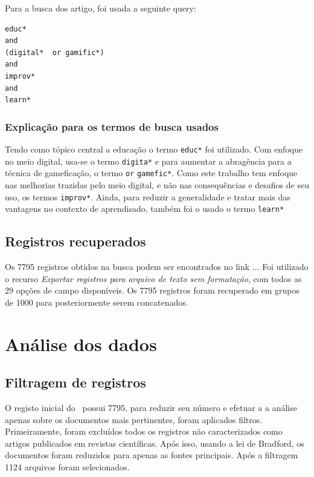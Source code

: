 Para a busca dos artigo, foi usada a seguinte query:
\begin{verbatim}
educ*
and
(digital*  or gamific*)
and
improv*
and
learn*
\end{verbatim}

\subsubsection{Explicação para os termos de busca usados\label{}}

Tendo como tópico central a educação o termo \texttt{educ*}  foi utilizado. Com enfoque no meio digital, usa-se o termo \texttt{digita*} e para aumentar a abragência para  a técnica de gameficação, o termo \texttt{or} \texttt{gamefic*}. Como este trabalho tem enfoque nas melhorias trazidas pelo meio digital, e não nas consequências e desafios de seu uso, os termos \texttt{improv*}. Ainda, para reduzir a generalidade e tratar mais das vantagens no contexto de aprendisado, também foi o usado o termo \texttt{learn*}


\subsection{Registros recuperados}

 Os 7795 registros obtidos na busca podem ser encontrados no link ...
Foi utilizado o recurso \textit{Exportar registros para arquivo de texto sem formatação}, com todos as 29 opções de campo disponíveis. Os 7795 registros foram recuperado em grupos de 1000 para posteriormente serem concatenados.

\section{Análise dos dados}

\subsection{Filtragem de registros}


O registo inicial do \dataset\ possui 7795, para reduzir seu número e efetuar a a análise apenas sobre os documentos mais pertinentes, foram aplicados filtros. Primeiramente, foram excluídos todos os registros não caracterizados como artigos publicados em revistas científicas. Após isso, usando a lei de Bradford, os documentos foram reduzidos para apenas as fontes principais. Após a filtragem 1124 arquivos foram selecionados.

